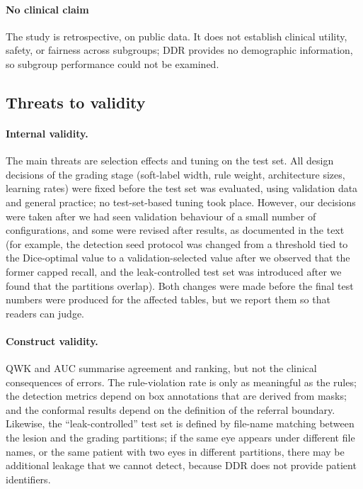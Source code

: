 \paragraph{No clinical claim} The study is retrospective, on public data. It does not establish clinical utility, safety, or fairness across subgroups; DDR provides no demographic information, so subgroup performance could not be examined.

\subsection{Threats to validity}
\paragraph{Internal validity.} The main threats are selection effects and tuning on the test set. All design decisions of the grading stage (soft-label width, rule weight, architecture sizes, learning rates) were fixed before the test set was evaluated, using validation data and general practice; no test-set-based tuning took place. However, our decisions were taken after we had seen validation behaviour of a small number of configurations, and some were revised after results, as documented in the text (for example, the detection seed protocol was changed from a threshold tied to the Dice-optimal value to a validation-selected value after we observed that the former capped recall, and the leak-controlled test set was introduced after we found that the partitions overlap). Both changes were made before the final test numbers were produced for the affected tables, but we report them so that readers can judge.

\paragraph{Construct validity.} QWK and AUC summarise agreement and ranking, but not the clinical consequences of errors. The rule-violation rate is only as meaningful as the rules; the detection metrics depend on box annotations that are derived from masks; and the conformal results depend on the definition of the referral boundary. Likewise, the ``leak-controlled'' test set is defined by file-name matching between the lesion and the grading partitions; if the same eye appears under different file names, or the same patient with two eyes in different partitions, there may be additional leakage that we cannot detect, because DDR does not provide patient identifiers.

